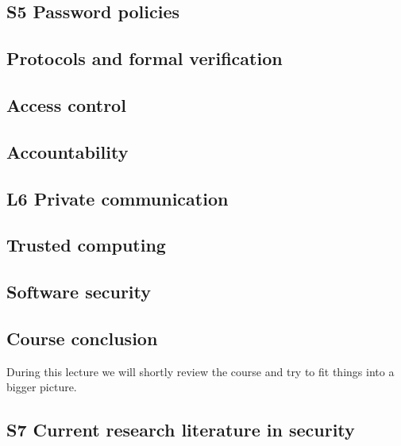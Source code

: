 \subsection{S5 Password policies}


\subsection{Protocols and formal verification}


\subsection{Access control}


%

\subsection{Accountability}


\subsection{L6 Private communication}


\subsection{Trusted computing}


\subsection{Software security}


\subsection{Course conclusion}

During this lecture we will shortly review the course and try to fit things into 
a bigger picture.

\subsection{S7 Current research literature in security}


